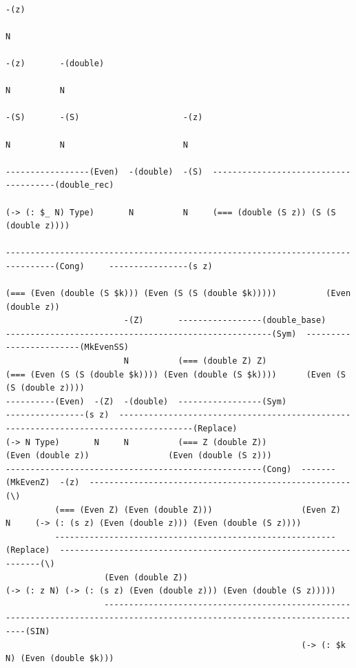 \documentclass[aspectratio=169]{beamer}
\makeatletter
\newcommand{\tinier}{\@setfontsize{\srcsize}{3.5pt}{3.5pt}}
\makeatother
\begin{document}
\begin{frame}[fragile]
{\color{dblue}
{\tinier
\begin{verbatim}
                                                                                                                     -(z)
                                                                                                                     N
                                                                                                          -(z)       -(double)
                                                                                                          N          N
                                                                                                          -(S)       -(S)                     -(z)
                                                                                                          N          N                        N
                                                                                 -----------------(Even)  -(double)  -(S)  --------------------------------------(double_rec)
                                                                                 (-> (: $_ N) Type)       N          N     (=== (double (S z)) (S (S (double z))))
                                                                                 --------------------------------------------------------------------------------(Cong)     ----------------(s z)
                                                                                                           (=== (Even (double (S $k))) (Even (S (S (double $k)))))          (Even (double z))
                        -(Z)       -----------------(double_base)                                          ------------------------------------------------------(Sym)  ------------------------(MkEvenSS)
                        N          (=== (double Z) Z)                                                      (=== (Even (S (S (double $k)))) (Even (double (S $k))))      (Even (S (S (double z))))
----------(Even)  -(Z)  -(double)  -----------------(Sym)                           ----------------(s z)  -------------------------------------------------------------------------------------(Replace)
(-> N Type)       N     N          (=== Z (double Z))                               (Even (double z))                (Even (double (S z)))
----------------------------------------------------(Cong)  -------(MkEvenZ)  -(z)  -----------------------------------------------------(\)
          (=== (Even Z) (Even (double Z)))                  (Even Z)          N     (-> (: (s z) (Even (double z))) (Even (double (S z))))
          ---------------------------------------------------------(Replace)  ------------------------------------------------------------------(\)
                    (Even (double Z))                                         (-> (: z N) (-> (: (s z) (Even (double z))) (Even (double (S z)))))
                    ----------------------------------------------------------------------------------------------------------------------------(SIN)
                                                            (-> (: $k N) (Even (double $k)))
\end{verbatim}
}
}

\end{frame}
\end{document}
